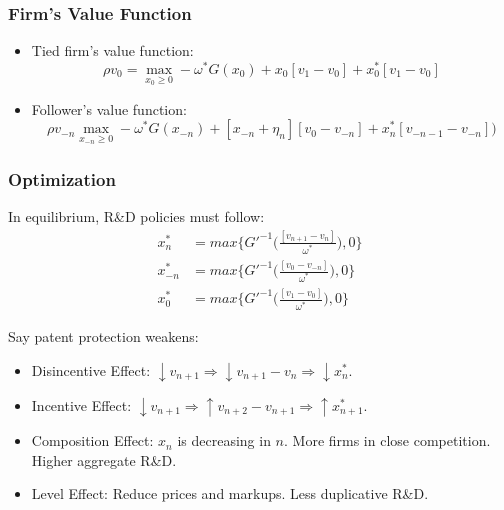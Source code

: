 \documentclass{beamer}
\begin{document}
\begin{frame}[t]\frametitle{Firm's Value Function} 
  \begin{itemize}
    \item<+-> Tied firm's value function:
      \begin{equation*} \label{eq:rvf_tied}
        \rho v_0 = \max_{x_0 \geq 0} -\omega^*G(x_{0}) + x_{0}[v_1 - v_0] + x_0^*[v_{1} - v_0]
      \end{equation*}

    \item<+-> Follower's value function:
      \begin{equation*} \label{eq:rvf_follower}
        \rho v_{-n} \max_{x_{-n} \geq 0} -\omega^*G(x_{-n}) + [x_{-n} + \eta_n][v_0 - v_{-n}] + x_n^*[v_{-n-1} - v_{-n}])
      \end{equation*}
  \end{itemize}
\end{frame}

\begin{frame}[t]\frametitle{Optimization} 
  In equilibrium, R\&D policies must follow:
  \begin{align*} \label{eq:ss_rd_policies}
    x_n^*    &= max \big\{G'^{-1}\Bigg(\frac{[v_{n+1} - v_n]}{\omega^*}\Bigg)   ,0\}\\
    x_{-n}^* &= max \big\{G'^{-1}\Bigg(\frac{[v_0  - v_{-n}]}{\omega^*}\Bigg)   ,0\}\\
    x_0^*    &= max \big\{G'^{-1}\Bigg(\frac{[v_1     - v_0]}{\omega^*}\Bigg)   ,0\}
  \end{align*}

  Say patent protection weakens:
  \begin{itemize}
    \item<2-> Disincentive Effect: $\downarrow v_{n+1} \Rightarrow \downarrow v_{n+1} - v_n \Rightarrow \downarrow x_n^*$.
    \item<3-> Incentive Effect: $\downarrow v_{n+1} \Rightarrow \uparrow v_{n+2} - v_{n+1} \Rightarrow \uparrow x_{n+1}^*$.
    \item<4-> Composition Effect: $x_n$ is decreasing in $n$. More firms in close competition. Higher aggregate R\&D.
    \item<5-> Level Effect: Reduce prices and markups.  Less duplicative R\&D.
  \end{itemize}
\end{frame}
\end{document}
